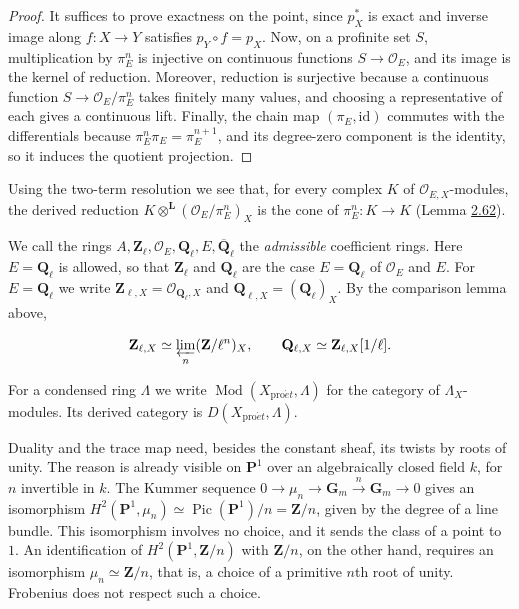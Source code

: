 \documentclass[11pt]{article}
\begin{document}
\begin{proof}[{Proof}]\label{bp162}%
It suffices to prove exactness on the point, since \(p_X^*\) is exact and inverse image along \(f:X\to Y\) satisfies \(p_Y\circ f=p_X\). Now, on a profinite set \(S\), multiplication by \(\pi_E^n\) is injective on continuous functions \(S\to\mathcal O_E\), and its image is the kernel of reduction. Moreover, reduction is surjective because a continuous function \(S\to\mathcal O_E/\pi_E^n\) takes finitely many values, and choosing a representative of each gives a continuous lift. Finally, the chain map \((\pi_E,\mathrm{id})\) commutes with the differentials because \(\pi_E^{n}\pi_E=\pi_E^{n+1}\), and its degree-zero component is the identity, so it induces the quotient projection.
\end{proof}

\label{bp163}%
Using the two-term resolution we see that, for every complex \(K\) of \(\mathcal O_{E,X}\)-modules, the derived reduction \(K\otimes^{\mathbf L}(\mathcal O_E/\pi_E^n)_X\) is the cone of \(\pi_E^n:K\to K\) (Lemma \hyperref[bp190]{2.62}).

We call the rings \(A,\mathbf Z_\ell,\mathcal O_E,\mathbf Q_\ell,E,\overline{\mathbf Q}_\ell\) the \emph{admissible} coefficient rings. Here \(E=\mathbf Q_\ell\) is allowed, so that \(\mathbf Z_\ell\) and \(\mathbf Q_\ell\) are the case \(E=\mathbf Q_\ell\) of \(\mathcal O_E\) and \(E\). For \(E=\mathbf Q_\ell\) we write \(\mathbf Z_{\ell,X}=\mathcal O_{\mathbf Q_\ell,X}\) and \(\mathbf Q_{\ell,X}=(\mathbf Q_\ell)_X\). By the comparison lemma above,

\[
\mathbf Z_{\ell,X}\simeq\varprojlim_n(\mathbf Z/\ell^n)_X,
\qquad
\mathbf Q_{\ell,X}\simeq\mathbf Z_{\ell,X}[1/\ell].
\]

For a condensed ring \(\Lambda\) we write \(\operatorname{Mod}(X_{\mathrm{pro}\acute{e}t},\Lambda)\) for the category of \(\Lambda_X\)-modules. Its derived category is \(D(X_{\mathrm{pro}\acute{e}t},\Lambda)\).

Duality and the trace map need, besides the constant sheaf, its twists by roots of unity. The reason is already visible on \(\mathbf P^1\) over an algebraically closed field \(k\), for \(n\) invertible in \(k\). The Kummer sequence \(0\to\mu_n\to\mathbf G_m\xrightarrow{n}\mathbf G_m\to0\) gives an isomorphism \(H^2(\mathbf P^1,\mu_n)\simeq\operatorname{Pic}(\mathbf P^1)/n=\mathbf Z/n\), given by the degree of a line bundle. This isomorphism involves no choice, and it sends the class of a point to \(1\). An identification of \(H^2(\mathbf P^1,\mathbf Z/n)\) with \(\mathbf Z/n\), on the other hand, requires an isomorphism \(\mu_n\simeq\mathbf Z/n\), that is, a choice of a primitive \(n\)th root of unity. Frobenius does not respect such a choice.
\end{document}
